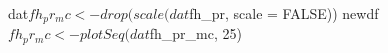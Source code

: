 \begin{Schunk}
\begin{Sinput}
 dat$fh_pr_mc <- drop(scale(dat$fh_pr, scale = FALSE))
 newdf$fh_pr_mc <- plotSeq(dat$fh_pr_mc, 25)
\end{Sinput}
\end{Schunk}
